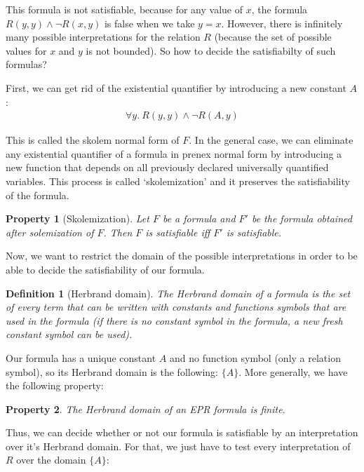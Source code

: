\documentclass[11pt,a4paper,oldfontcommands,openany]{memoir}
\newtheorem*{definition}{Definition}
\newtheorem*{property}{Property}
\begin{document}
        This formula is not satisfiable, because for any value of \(x\), the formula \(R(y,y) \land \neg R(x,y)\) is false when we take \(y=x\).
        However, there is infinitely many possible interpretations for the relation \(R\) (because the set of possible values for \(x\) and \(y\) is not bounded).
        So how to decide the satisfiabilty of such formulas?

        First, we can get rid of the existential quantifier by introducing a new constant \(A\):
        \begin{align*}
            \forall y. \ R(y,y) \land \neg R(A,y)
        \end{align*}

        This is called the skolem normal form of \(F\).
        In the general case, we can eliminate any existential quantifier of a formula in prenex normal form by introducing a new function
        that depends on all previously declared universally quantified variables. This process is called `skolemization' and it preserves the satisfiability of the formula.

        \begin{property}[Skolemization]
            Let \(F\) be a formula and \(F'\) be the formula obtained after solemization of \(F\). Then \(F\) is satisfiable iff \(F'\) is satisfiable.
        \end{property}

        Now, we want to restrict the domain of the possible interpretations in order to be able to decide the satisfiability of our formula.

        \begin{definition}[Herbrand domain]
            The Herbrand domain of a formula is the set of every term that can be written with constants and functions symbols that are used in the formula
            (if there is no constant symbol in the formula, a new fresh constant symbol can be used).
        \end{definition}

        Our formula has a unique constant \(A\) and no function symbol (only a relation symbol), so its Herbrand domain is the following:
        \( \{A\} \). More generally, we have the following property:
        
        \begin{property}
        The Herbrand domain of an EPR formula is finite.
        \end{property}

        Thus, we can decide whether or not our formula is satisfiable by an interpretation over it's Herbrand domain.
        For that, we just have to test every interpretation of \(R\) over the domain \( \{A\} \):
\end{document}
